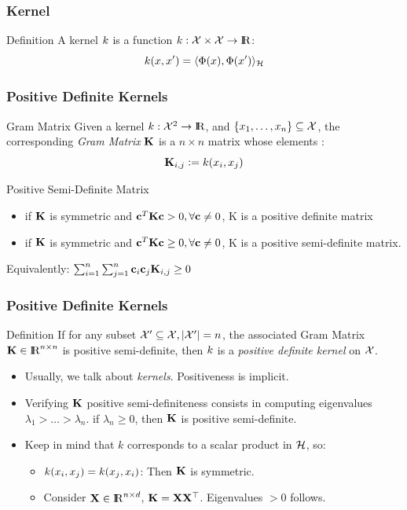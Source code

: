 \documentclass[11pt, pdf, compress, handout]{beamer}
\begin{document}
\begin{frame}
  \frametitle{Kernel}
  {\Large\begin{block}{Definition}
          A kernel ${\mathnormal{k}}$ is a function ${\mathnormal{k}}: {\mathcal{X}} \times {\mathcal{X}} \to {\mathrm{I\hskip-2.2pt R}}$:
    {\Huge $${\mathnormal{k}}({\mathnormal{x}},{\mathnormal{x}}') = \langle \Phi({\mathnormal{x}}), \Phi({\mathnormal{x}}') \rangle_{\mathcal{H}}$$}
  \end{block}}

\end{frame} 

\begin{frame}
  \frametitle{Positive Definite Kernels}
  \begin{block}{Gram Matrix}
    Given a kernel $k : {\mathcal{X}}^2 \to {\mathrm{I\hskip-2.2pt R}}$, and $\{ {\mathnormal{x}}_1, \dots,
    {\mathnormal{x}}_n\} \subseteq {\mathcal{X}}$, the corresponding \emph{Gram Matrix} ${\mathbf{K}}$
    is a $n \times n$ matrix whose elements :
    $${\mathbf{K}}_{i,j} \mathrel{\mathop:}=   {\mathnormal{k}}({\mathnormal{x}}_i, {\mathnormal{x}}_j)$$
  \end{block}

  \begin{block}{Positive Semi-Definite Matrix}
    \begin{itemize}
    \item if ${\mathbf{K}}$ is symmetric and  ${\mathbf{c}}^T{\mathbf{K}}{\mathbf{c}} > 0, \forall {\mathbf{c}} \neq 0$, K is a positive
      definite matrix
    \item if ${\mathbf{K}}$ is symmetric and ${\mathbf{c}}^T{\mathbf{K}}{\mathbf{c}} \geq 0, \forall {\mathbf{c}} \neq 0$, K is a positive
      semi-definite matrix.
    \end{itemize}
    Equivalently:
    $\sum_{i=1}^n \sum_{j=1}^n {\mathbf{c}}_i {\mathbf{c}}_j {\mathbf{K}}_{i,j} \geq 0$
  \end{block}
\end{frame}

\begin{frame}[allowframebreaks]
  \frametitle{Positive Definite Kernels}
  \begin{block}{Definition}
    If for any subset ${\mathcal{X}}'\subseteq {\mathcal{X}}, |{\mathcal{X}}'| = n$, the
    associated Gram Matrix ${\mathbf{K}} \in {\mathrm{I\hskip-2.2pt R}}^{n \times n}$ is positive semi-definite, then \emph{${\mathnormal{k}}$} is a
    \emph{positive definite kernel} on ${\mathcal{X}}$.
  \end{block}
  
  \begin{itemize}
  \item Usually, we talk about \emph{kernels}. Positiveness is implicit.
  \item Verifying ${\mathbf{K}}$ positive semi-definiteness consists in computing
    eigenvalues $ \lambda_1 > \dots > \lambda_n$. if $\lambda_n \geq
    0$, then ${\mathbf{K}}$ is positive semi-definite.
  \item Keep in mind that $k$ corresponds to a scalar product in ${\mathcal{H}}$, so:
    \begin{itemize}
    \item ${\mathnormal{k}}({\mathnormal{x}}_i,{\mathnormal{x}}_j) = {\mathnormal{k}}({\mathnormal{x}}_j,{\mathnormal{x}}_i)$: Then ${\mathbf{K}}$
      is symmetric.
    \item Consider ${\mathbf{X}} \in {\mathrm{I\hskip-2.2pt R}}^{n \times d}$, ${\mathbf{K}} =
      {\mathbf{X}}{\mathbf{X}}^\top$. Eigenvalues $> 0$ follows.
    \end{itemize}
  \end{itemize}
  
\end{frame}
\end{document}

